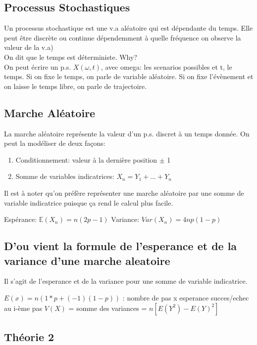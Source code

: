 \documentclass{article}
\begin{document}
\subsection{Processus Stochastiques}

Un processus stochastique est une v.a aléatoire qui est dépendante du temps.
Elle peut être discrète ou continue dépendemment à quelle fréquence on
observe la valeur de la v.a)\\

On dit que le temps est déterministe. Why?\\

On peut écrire un p.s. $X( \omega, t )$, avec omega: les scenarios
possibles et t, le temps. Si on fixe le temps, on parle de variable
aléatoire. Si on fixe l'évènement et on laisse le temps libre, on
parle de trajectoire.

\subsection{Marche Aléatoire}

La marche aléatoire représente la valeur d'un p.s. discret à un temps donnée.
On peut la modéliser de deux façons:
\begin{enumerate}
    \item Conditionnement: valeur à la dernière position $\pm$ 1
    \item Somme de variables indicatrices: $X_n = Y_1 + ... +Y_n$
\end{enumerate}

Il est à noter qu'on préfère représenter une marche aléatoire par une
somme de variable indicatrice puisque ça rend le calcul plus facile.

Espérance: $\mathbb{E} (X_n) = n (2p-1)$
Variance: $ Var(X_n)= 4np(1-p)$

\subsection{D'ou vient la formule de l'esperance et de la variance d'une
marche aleatoire}

Il s'agit de l'esperance et de la variance pour une somme de variable
indicatrice.

$E(x) = n(1 * p + (-1) (1-p))$ : nombre de pas x esperance succes/echec au
i-ème pas
$V(X)$ = somme des variances = $ n [ E(Y^2) - E(Y)^2 ]$

\subsection{Théorie 2}
\end{document}
